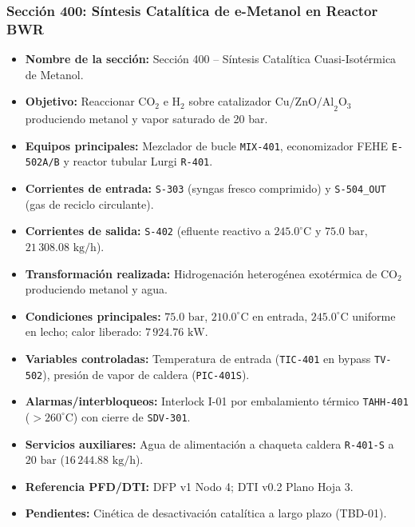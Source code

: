 \documentclass[10pt,letterpaper]{article}
\begin{document}
\subsubsection{Sección 400: Síntesis Catalítica de e-Metanol en Reactor BWR}
\begin{itemize}
    \item \textbf{Nombre de la sección:} Sección 400 -- Síntesis Catalítica Cuasi-Isotérmica de Metanol.
    \item \textbf{Objetivo:} Reaccionar $\text{CO}_2$ e $\text{H}_2$ sobre catalizador $\text{Cu/ZnO/Al}_2\text{O}_3$ produciendo metanol y vapor saturado de 20 bar.
    \item \textbf{Equipos principales:} Mezclador de bucle \texttt{MIX-401}, economizador FEHE \texttt{E-502A/B} y reactor tubular Lurgi \texttt{R-401}.
    \item \textbf{Corrientes de entrada:} \texttt{S-303} (syngas fresco comprimido) y \texttt{S-504\_OUT} (gas de reciclo circulante).
    \item \textbf{Corrientes de salida:} \texttt{S-402} (efluente reactivo a $245.0^\circ\text{C}$ y $75.0\text{ bar}$, $21\,308.08\text{ kg/h}$).
    \item \textbf{Transformación realizada:} Hidrogenación heterogénea exotérmica de $\text{CO}_2$ produciendo metanol y agua.
    \item \textbf{Condiciones principales:} $75.0\text{ bar}$, $210.0^\circ\text{C}$ en entrada, $245.0^\circ\text{C}$ uniforme en lecho; calor liberado: $7\,924.76\text{ kW}$.
    \item \textbf{Variables controladas:} Temperatura de entrada (\texttt{TIC-401} en bypass \texttt{TV-502}), presión de vapor de caldera (\texttt{PIC-401S}).
    \item \textbf{Alarmas/interbloqueos:} Interlock I-01 por embalamiento térmico \texttt{TAHH-401} ($>260^\circ\text{C}$) con cierre de \texttt{SDV-301}.
    \item \textbf{Servicios auxiliares:} Agua de alimentación a chaqueta caldera \texttt{R-401-S} a $20\text{ bar}$ ($16\,244.88\text{ kg/h}$).
    \item \textbf{Referencia PFD/DTI:} DFP v1 Nodo 4; DTI v0.2 Plano Hoja 3.
    \item \textbf{Pendientes:} Cinética de desactivación catalítica a largo plazo (TBD-01).
\end{itemize}
\end{document}
